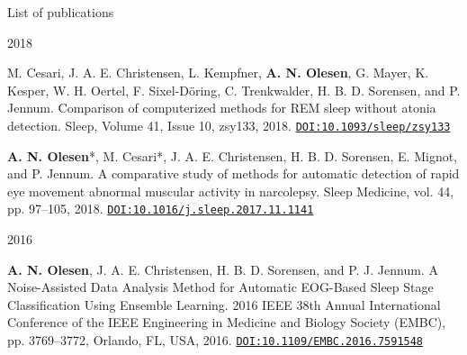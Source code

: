 \begin{rSection}{List of publications}
\begin{PublicationYear}{2018}{}{}{}
	    \item M. Cesari, J. A. E. Christensen, L. Kempfner, \textbf{A. N. Olesen}, G. Mayer, K. Kesper, W. H. Oertel, F. Sixel-Döring, C. Trenkwalder, H. B. D. Sorensen, and P. Jennum. Comparison of computerized methods for REM sleep without atonia detection. Sleep, Volume 41, Issue 10, zsy133, 2018. \href{https://doi.org/10.1093/sleep/zsy133}{\texttt{DOI:10.1093/sleep/zsy133}}
	    
	    \item \textbf{A. N. Olesen}\mbox{*}, M. Cesari\mbox{*}, J. A. E. Christensen, H. B. D. Sorensen, E. Mignot, and P. Jennum. A comparative study of methods for automatic detection of rapid eye movement abnormal muscular activity in narcolepsy. Sleep Medicine, vol. 44, pp. 97–105, 2018. \href{https://doi.org/10.1016/j.sleep.2017.11.1141}{\texttt{DOI:10.1016/j.sleep.2017.11.1141}}
	\end{PublicationYear}
	
	\begin{PublicationYear}{2016}{}{}{}
	    \item \textbf{A. N. Olesen}, J. A. E. Christensen, H. B. D. Sorensen, and P. J. Jennum. A Noise-Assisted Data Analysis Method for Automatic EOG-Based Sleep Stage Classification Using Ensemble Learning. 2016 IEEE 38th Annual International Conference of the IEEE Engineering in Medicine and Biology Society (EMBC), pp. 3769–3772, Orlando, FL, USA, 2016. \href{https://doi.org/10.1109/EMBC.2016.7591548}{\texttt{DOI:10.1109/EMBC.2016.7591548}}
	\end{PublicationYear}
	
	
\end{rSection}
